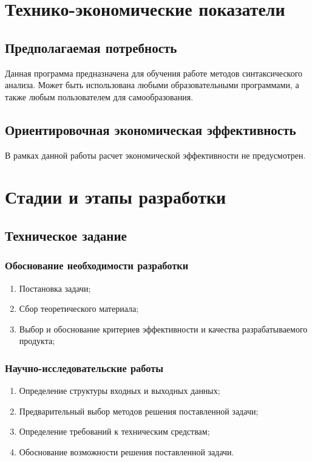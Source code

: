 \documentclass[a4paper,12pt,reqno]{article}
\begin{document}
  \newpage
  \section{Технико-экономические показатели}
  \subsection{Предполагаемая потребность}
  Данная программа предназначена для обучения работе методов синтаксического анализа.
  Может быть использована любыми образовательными программами, а также любым пользователем для самообразования.

  \subsection{Ориентировочная экономическая эффективность}
  В рамках данной работы расчет экономической эффективности не предусмотрен.

  \newpage
  \section{Стадии и этапы разработки}
    \subsection{Техническое задание}
      \subsubsection*{Обоснование необходимости разработки}
      \begin{enumerate}
        \item Постановка задачи;
        \item Сбор теоретического материала;
        \item Выбор и обоснование критериев эффективности и качества разрабатываемого продукта;
      \end{enumerate}
      \subsubsection*{Научно-исследовательские работы}
      \begin{enumerate}
        \item Определение структуры входных и выходных данных;
        \item Предварительный выбор методов решения поставленной задачи;
        \item Определение требований к техническим средствам;
        \item Обоснование возможности решения поставленной задачи.
      \end{enumerate}
\end{document}
